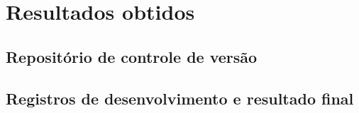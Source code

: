 \chapter{Resultados obtidos}

\section{Repositório de controle de versão}

\section{Registros de desenvolvimento e resultado final}



